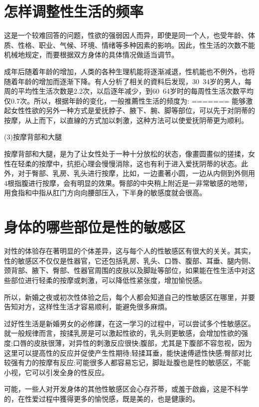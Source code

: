 \documentclass[12pt,UTF8]{ctexbook}
\begin{document}
\section{怎样调整性生活的频率}

这是一个较难回答的问题，性欲的强弱因人而异，即使是同一个人，也受年龄、体质、性格、职业、气候、环境、情绪等多种因素的影响。因此，性生活的次数不能机械地规定，而要根据双方身体的具体情况做适当调节。

成年后随着年龄的增加，人类的各种生理机能将逐渐减退，性机能也不例外，也将随着年龄的增加而逐渐下降。有人分析了相关的資料后发现，30~34岁的男人，每周的平均性生活次数是2.2次，以后逐年减少，到60~64岁时的每周性生活次数平均仅0.7次。所以，根据年龄的变化，一般推薦性生活的频度为:
=======
能够激起女性性欲的另外一种方式是爱抚脖子、腋下、腕、脚等部位，可以先于对阴蒂的按摩，从上而下，以直線的方式加以刺激，这种方法可以使爱抚阴蒂更为顺利。

(3)按摩背部和大腿

按摩背部和大腿，是为了让女性处于一种十分放松的状态，像畫圆畫似的搓揉，女性在轻柔的按摩中，抗拒心理会慢慢消除，这也有利于进入爱抚阴蒂的状态。此外，对于臀部、乳房、乳头进行按摩，比如，一边畫著小圆，一边从内侧到外侧用4根指腹进行按摩，会有明显的效果。臀部的中央稍上附近是一非常敏感的地带，用食指和中指从肛门方向向腰部压入，下半身的敏感度就会很高。

\section{身体的哪些部位是性的敏感区}

对性的体验存在著明显的个体差异，这与每个人的性敏感区有很大的关关。其实，性的敏感区不仅仅是性器官，它还包括乳房、乳头、口唇、腹部、耳垂、腿内侧、颈背部、腋下、臀部、性器官周围的皮肤以及脚趾等部位，如果能在性生活中对这些部位进行轻柔的按摩或刺激，可以降低性紧张度，增加愉悦感。

所以，新婚之夜或初次性体验之后，每个人都会知道自己的性敏感区在哪里，并要告知对方，这样性生活才容易顺利，能避免很多麻煩。

过好性生活是新婚男女的必修課，在这一学习的过程中，可以尝试多个性敏感区。就一般规律而言，按揉乳房是可以激起性欲的，乳头则更敏感，会增加性欲的强度;口唇的皮肤很薄，对异性的刺激反应很快;腹部，尤其是下腹部不容忽视，因为这里可以提高性的反应并促使产生性期待;轻揉耳垂，能快速傅遞性快感;臀部对比较强有力的按摩有反应;可能很多人都容易忘记，脚趾趾腹也是性的敏感区，不能小视，它可以引发全身的性反应。

可能，一些人对开发身体的其他性敏感区会心存芥蒂，或羞于啟齒，这是不科学的，在性爱过程中獲得更多的愉悦感，既是美的，也是健康的。
\end{document}

